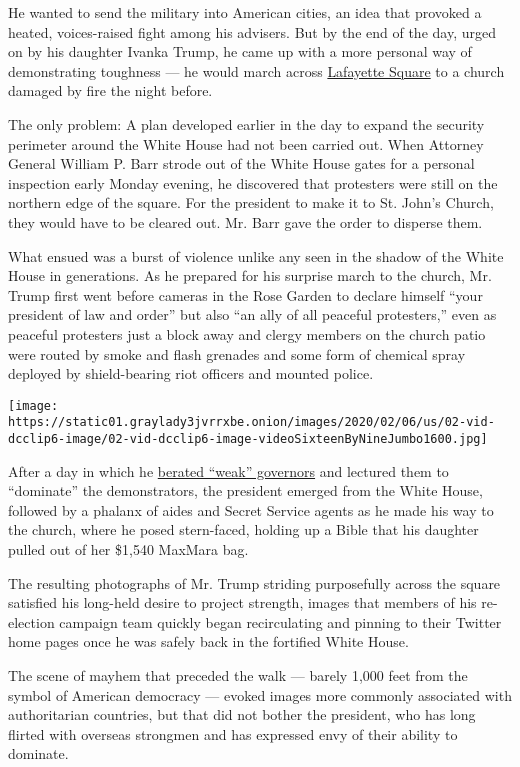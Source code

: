 He wanted to send the military into American cities, an idea that
provoked a heated, voices-raised fight among his advisers. But by the
end of the day, urged on by his daughter Ivanka Trump, he came up with a
more personal way of demonstrating toughness --- he would march across
\href{https://www.nytimes3xbfgragh.onion/2020/07/28/us/politics/lafayette-square-park-police-protests.html}{Lafayette
Square} to a church damaged by fire the night before.

The only problem: A plan developed earlier in the day to expand the
security perimeter around the White House had not been carried out. When
Attorney General William P. Barr strode out of the White House gates for
a personal inspection early Monday evening, he discovered that
protesters were still on the northern edge of the square. For the
president to make it to St. John's Church, they would have to be cleared
out. Mr. Barr gave the order to disperse them.

What ensued was a burst of violence unlike any seen in the shadow of the
White House in generations. As he prepared for his surprise march to the
church, Mr. Trump first went before cameras in the Rose Garden to
declare himself ``your president of law and order'' but also ``an ally
of all peaceful protesters,'' even as peaceful protesters just a block
away and clergy members on the church patio were routed by smoke and
flash grenades and some form of chemical spray deployed by
shield-bearing riot officers and mounted police.

\texttt{[image: https://static01.graylady3jvrrxbe.onion/images/2020/02/06/us/02-vid-dcclip6-image/02-vid-dcclip6-image-videoSixteenByNineJumbo1600.jpg]}

After a day in which he
\href{https://www.nytimes3xbfgragh.onion/2020/06/01/us/politics/trump-governors.html}{berated
``weak'' governors} and lectured them to ``dominate'' the demonstrators,
the president emerged from the White House, followed by a phalanx of
aides and Secret Service agents as he made his way to the church, where
he posed stern-faced, holding up a Bible that his daughter pulled out of
her \$1,540 MaxMara bag.

The resulting photographs of Mr. Trump striding purposefully across the
square satisfied his long-held desire to project strength, images that
members of his re-election campaign team quickly began recirculating and
pinning to their Twitter home pages once he was safely back in the
fortified White House.

The scene of mayhem that preceded the walk --- barely 1,000 feet from
the symbol of American democracy --- evoked images more commonly
associated with authoritarian countries, but that did not bother the
president, who has long flirted with overseas strongmen and has
expressed envy of their ability to dominate.

